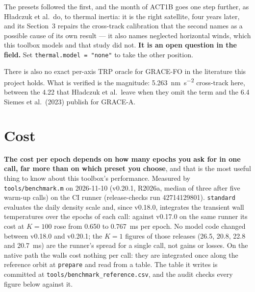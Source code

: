 \documentclass[11pt,a4paper]{report}
\begin{document}
\noindent The presets followed the first, and the month of ACT1B goes one step further, as Hładczuk et al.\
do, to thermal inertia: it is the right satellite, four years later, and its
Section~3 repairs the cross-track calibration that the second names as a possible cause of its own
result --- it also names neglected horizontal winds, which this toolbox models and that study did
not. \textbf{It is an open question in the field.} Set \texttt{thermal.model = "none"} to take the
other position.

There is also no exact per-axis TRP oracle for GRACE-FO in the literature this project holds. What
is verified is the magnitude: \SI{5.263}{\nano\metre\per\second\squared} cross-track here, between
the \SI{4.22}{} that Hładczuk et al.\ leave when they omit the term and the \SI{6.4}{} Siemes et al.\
(2023) publish for GRACE-A.

\section{Cost}
\textbf{The cost per epoch depends on how many epochs you ask for in one call, far more than on which
preset you choose}, and that is the most useful thing to know about this toolbox's performance.
Measured by \texttt{tools/benchmark.m} on 2026-11-10 (v0.20.1, R2026a, median of three after five
warm-up calls) on the CI runner (release-checks run 42714129801). \texttt{standard} evaluates the
daily density scale and, since v0.18.0, integrates the transient wall temperatures over the epochs of
each call: against v0.17.0 on the same runner its cost at $K=100$ rose from 0.650 to
\SI{0.767}{\milli\second} per epoch. No model code changed between v0.18.0 and v0.20.1; the $K=1$
figures of those releases (26.5, 20.8, 22.8 and \SI{20.7}{\milli\second}) are the runner's spread
for a single call, not gains or losses. On the native
path the walls cost nothing per call: they are integrated once along the reference orbit at
\texttt{prepare} and read from a table. The table it writes is committed at
\texttt{tools/benchmark\_reference.csv}, and the audit checks every figure below against it.
\end{document}
